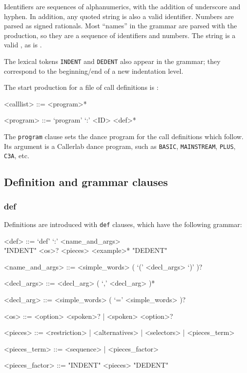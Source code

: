 \documentclass[12pt]{article}
\newcommand{\clause}[1]{\texttt{#1}}
\renewcommand{\call}[1]{\texttt{#1}} %
\begin{document}
Identifiers are sequences of alphanumerics, with the addition of
underscore and hyphen.  In addition, any quoted string is also a valid
identifier.  Numbers are parsed as signed rationals.  Most
``names'' in the grammar are parsed with the 
production, so they are a sequence of identifiers and numbers.  The
string  is a valid
, as is .

The lexical tokens {\tt INDENT} and {\tt DEDENT} also appear in the grammar;
they correspond to the beginning/end of a new indentation level.

The start production for a file of call definitions is :
\begin{grammar}
<calllist> ::= <program>*

<program> ::= `program' `:' <ID> <def>*
\end{grammar}

The \clause{program} clause sets the dance program for the call
definitions which follow.  Its argument is a Callerlab dance program, such as
\call{BASIC}, \call{MAINSTREAM}, \call{PLUS}, \call{C3A}, etc.

\subsection{Definition and grammar clauses}
\subsubsection{def}
Definitions are introduced with \clause{def} clauses, which have the
following grammar:

\begin{grammar}
<def> ::= `def' `:' <name_and_args> \\ "INDENT" <os>? <pieces> <example>* "DEDENT"

<name_and_args> ::= <simple_words> ( `(' <decl_args> `)' )?

<decl_args> ::= <decl_arg> ( `,' <decl_arg> )*

<decl_arg> ::= <simple_words> ( `=' <simple_words> )?

<os> ::= <option> <spoken>? | <spoken> <option>?

<pieces> ::= <restriction> | <alternatives> | <selectors> | <pieces_term>

<pieces_term> ::= <sequence> | <pieces_factor>

<pieces_factor> ::= "INDENT" <pieces> "DEDENT"
\end{grammar}
\end{document}

